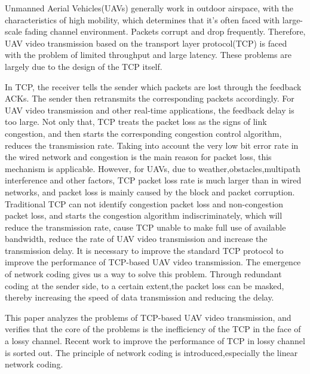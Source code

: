 
\eabstract
{
	Unmanned Aerial Vehicles(UAVs) generally work in outdoor airspace, 
	with the characteristics of high mobility,
	which determines that it's often faced with large-scale fading channel environment. 
	Packets corrupt and drop frequently.
	Therefore, UAV video transmission based on the transport layer protocol(TCP) is faced with the problem of limited throughput and large latency. 
	These problems are largely due to the design of the TCP itself.
	\par
	In TCP, 
	the receiver tells the sender which packets are lost through the feedback ACKs. 
	The sender then retransmits the corresponding packets accordingly.
	For UAV video transmission and other real-time applications,
	the feedback delay is too large.
	Not only that, TCP treats the packet loss as the signs of link congestion, and then starts the corresponding congestion control algorithm, reduces the transmission rate.
	Taking into account the very low bit error rate in the wired network and congestion is the main reason for packet loss,
	this mechanism is applicable.
	However, for UAVs, due to weather,obstacles,multipath interference and other factors, TCP packet loss rate is much larger than in wired networks, and packet loss is mainly caused by the block and packet corruption.
	Traditional TCP can not identify congestion packet loss and non-congestion packet loss, and starts the congestion algorithm indiscriminately, which will reduce the transmission rate, cause TCP unable to make full use of available bandwidth, reduce the rate of UAV video transmission and increase the transmission delay.
	It is necessary to improve the standard TCP protocol to improve the performance of TCP-based UAV video transmission.
	The emergence of network coding gives us a way to solve this problem.
	Through redundant coding at the sender side, to a certain extent,the packet loss can be masked, thereby increasing the speed of data transmission and reducing the delay.
	\par
	This paper analyzes the problems of TCP-based UAV video transmission, and verifies that the core of the problems is the inefficiency of the TCP in the face of a lossy channel. 
	Recent work to improve the performance of TCP in lossy channel is sorted out.
	The principle of network coding is introduced,especially the linear network coding.
}
